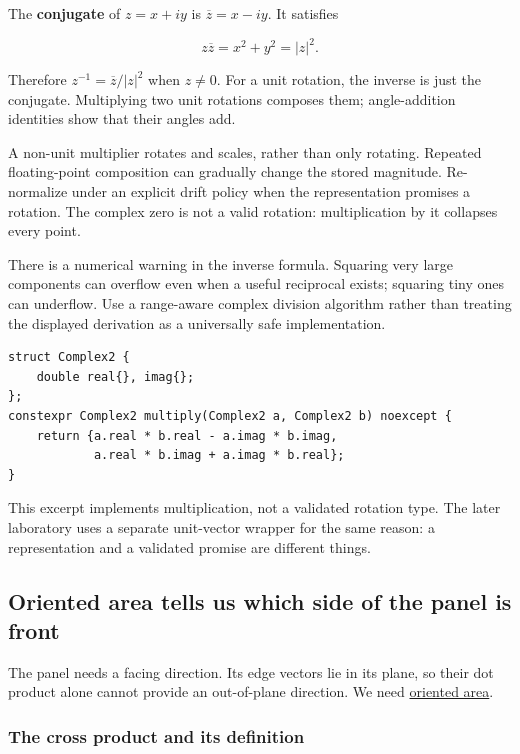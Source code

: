 The \textbf{conjugate} of \(z=x+iy\) is \(\overline z=x-iy\). It satisfies

\[
z\overline z=x^2+y^2=|z|^2.
\]

Therefore \(z^{-1}=\overline z/|z|^2\) when \(z\ne0\). For a unit rotation, the inverse is just the conjugate. Multiplying two unit rotations composes them; angle-addition identities show that their angles add.

A non-unit multiplier rotates and scales, rather than only rotating. Repeated floating-point composition can gradually change the stored magnitude. Re-normalize under an explicit drift policy when the representation promises a rotation. The complex zero is not a valid rotation: multiplication by it collapses every point.

There is a numerical warning in the inverse formula. Squaring very large components can overflow even when a useful reciprocal exists; squaring tiny ones can underflow. Use a range-aware complex division algorithm rather than treating the displayed derivation as a universally safe implementation.

\begin{verbatim}
struct Complex2 {
    double real{}, imag{};
};
constexpr Complex2 multiply(Complex2 a, Complex2 b) noexcept {
    return {a.real * b.real - a.imag * b.imag,
            a.real * b.imag + a.imag * b.real};
}
\end{verbatim}

This excerpt implements multiplication, not a validated rotation type. The later laboratory uses a separate unit-vector wrapper for the same reason: a representation and a validated promise are different things.

\subsection{Oriented area tells us which side of the panel is front}\label{oriented-area-tells-us-which-side-of-the-panel-is-front}

The panel needs a facing direction. Its edge vectors lie in its plane, so their dot product alone cannot provide an out-of-plane direction. We need \hyperref[01-foundations-i-ch017]{oriented area}.

\subsubsection{The cross product and its definition}\label{the-cross-product-and-its-definition}

